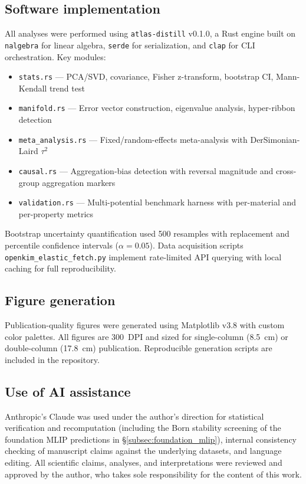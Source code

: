 \documentclass[twocolumn,9pt]{extarticle}
\begin{document}
\subsection{Software implementation}

All analyses were performed using \texttt{atlas-distill} v0.1.0, a Rust engine built on \texttt{nalgebra} for linear algebra, \texttt{serde} for serialization, and \texttt{clap} for CLI orchestration. Key modules:
\begin{itemize}
\item \texttt{stats.rs} --- PCA/SVD, covariance, Fisher z-transform, bootstrap CI, Mann-Kendall trend test
\item \texttt{manifold.rs} --- Error vector construction, eigenvalue analysis, hyper-ribbon detection
\item \texttt{meta\_analysis.rs} --- Fixed/random-effects meta-analysis with DerSimonian-Laird $\tau^2$
\item \texttt{causal.rs} --- Aggregation-bias detection with reversal magnitude and cross-group aggregation markers
\item \texttt{validation.rs} --- Multi-potential benchmark harness with per-material and per-property metrics
\end{itemize}

Bootstrap uncertainty quantification used 500 resamples with replacement and percentile confidence intervals ($\alpha = 0.05$). Data acquisition scripts \texttt{openkim\_elastic\_fetch.py} implement rate-limited API querying with local caching for full reproducibility.

\subsection{Figure generation}

Publication-quality figures were generated using Matplotlib v3.8 with custom color palettes. All figures are 300~DPI and sized for single-column (8.5~cm) or double-column (17.8~cm) publication. Reproducible generation scripts are included in the repository.

\subsection{Use of AI assistance}

Anthropic's Claude was used under the author's direction for statistical verification and recomputation (including the Born stability screening of the foundation MLIP predictions in \S\ref{subsec:foundation_mlip}), internal consistency checking of manuscript claims against the underlying datasets, and language editing. All scientific claims, analyses, and interpretations were reviewed and approved by the author, who takes sole responsibility for the content of this work.
\end{document}
